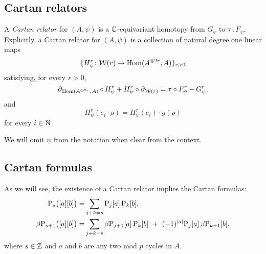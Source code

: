 \subsection{Cartan relators}\label{ss:cartan_relators}

A \textit{Cartan relator} for $(A,\psi)$ is a $\mathbb{C}$-equivariant homotopy from $G_\psi$ to $\tau \comp F_\psi$.
Explicitly, a Cartan relator for $(A,\psi)$ is a collection of natural degree one linear maps
\[
\{H^r_\psi \colon \mathcal{W}(r) \to \mathrm{Hom}(A^{\otimes 2r}, A)\}_{r>0}
\]
satisfying, for every $r > 0$,
\[
\operatorname{\partial}_{\mathrm{Hom}(A^{\otimes 2r},\, A)} \mathbin{\circ} \,H^r_\psi + H^r_\psi \mathbin{\circ} \operatorname{\partial}_{\mathcal{W}(r)} = \tau \mathbin{\circ} F^r_\psi - G^r_\psi,
\]
and
\[
H^r_\psi(e_i \cdot \rho) = H^r_\psi(e_i) \cdot g(\rho)
\]
for every $i \in \mathbb{N}$.

We will omit $\psi$ from the notation when clear from the context.

\subsection{Cartan formulas}

As we will see, the existence of a Cartan relator implies the Cartan formulas:
\begin{align*}
	\mathrm{P}_{s}\big([a][b]\big) =&
	\sum_{j+k=s} \mathrm{P}_j[a] \, \mathrm{P}_k[b], \\
	\beta \mathrm{P}_{s+1}\big([a][b]\big) =&
	\sum_{j+k=s} \beta \mathrm{P}_{j+1}[a] \, \mathrm{P}_k[b] \ +\ (-1)^{\lvert a\rvert} \mathrm{P}_j[a] \, \beta \mathrm{P}_{k+1}[b],
\end{align*}
where $s \in \mathbb{Z}$ and $a$ and $b$ are any two mod $p$ cycles in $A$.

